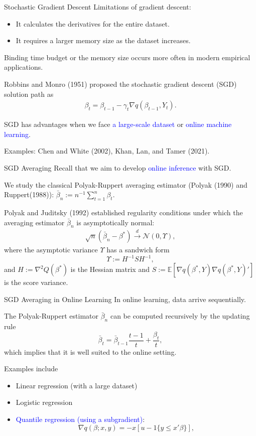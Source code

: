 \documentclass[beamer, t]{beamer}
\newcommand{\eqs}[1]{\begin{align*}#1\end{align*}}
\newcommand{\bit}{\begin{itemize}}
\newcommand{\eit}{\end{itemize}}
\newcommand{\tcb}{\textcolor{blue}}
\begin{document}
\begin{frame}{Stochastic Gradient Descent}
Limitations of gradient descent:
\bit
    \item It calculates the derivatives for the entire dataset.
    \item It requires a larger memory size as the dataset increases.
\eit
Binding time budget or the memory size occurs more often in modern empirical applications. 
\bigskip

Robbins and Monro (1951) proposed the stochastic gradient descent (SGD) solution path as
        \eqs{
            \beta_{t}=\beta_{t-1}-\gamma_{t}\nabla q\left(\beta_{t-1},Y_{t}\right).
        }

SGD has advantages when we face \tcb{a large-scale dataset} or \tcb{online machine learning}.

Examples: Chen and White (2002), Khan, Lan, and Tamer (2021). 
\end{frame}




\begin{frame}{SGD Averaging}
Recall that we aim to develop \tcb{online inference} with SGD. 
\bigskip

We study the classical Polyak-Ruppert averaging estimator (Polyak (1990) and Ruppert(1988)):
$\bar{\beta}_{n}:=n^{-1}\sum_{t=1}^{n}\beta_{t}$.
\medskip

Polyak and Juditsky (1992)
established regularity conditions under which
the averaging estimator $\bar{\beta}_{n}$ is asymptotically normal:
\begin{align*}
\sqrt{n}\left(\bar{\beta}_{n}-\beta^{*}\right)\overset{d}{\to}
\mathcal{N} (0, \Upsilon),
\end{align*}
where the asymptotic variance $\Upsilon$ has a sandwich form $$\Upsilon := H^{-1}S H^{-1},$$ and
$H := \nabla^{2}Q\left(\beta^{*}\right)$ is the Hessian matrix
and $S := \mathbb{E} \left[\nabla q\left(\beta^{*},Y\right)\nabla q\left(\beta^{*},Y\right)'\right]$ is the score variance.
\end{frame}


\begin{frame}{SGD Averaging in Online Learning}
In online learning, data arrive sequentially.
\bigskip


The  Polyak-Ruppert estimator $\bar{\beta}_{n}$ can be computed recursively
by the updating rule $$\bar{\beta}_{t}=\bar{\beta}_{t-1}\frac{t-1}{t}+\frac{\beta_{t}}{t},$$
which implies that it is well suited to the online setting.

\bigskip

Examples include
\bit
    \item Linear regression (with a large dataset)
    \item Logistic regression
    \item \tcb{Quantile regression (using a subgradient)}:
    		$$
			\nabla q(\beta; x,y)= - x[u-1\{y\leq x'\beta\}],
			$$
\eit
\end{frame}
\end{document}
